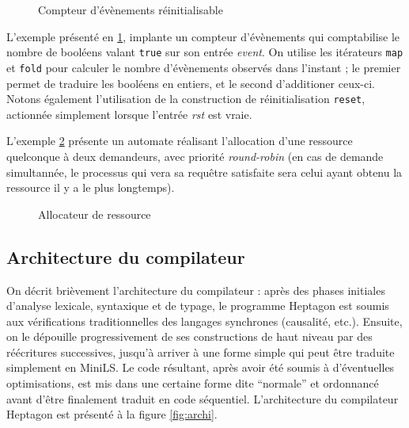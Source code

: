 \documentclass[9pt,a4paper]{article}
\newcommand{\LANG}{Heptagon}
\begin{document}
\begin{figure}[htp]
  \centering
  
  \caption{Compteur d'évènements réinitialisable}
  \label{fig:ex_count}
\end{figure}

L'exemple présenté en \ref{fig:ex_count}, implante un compteur d'évènements qui
comptabilise le nombre de booléens valant \texttt{true} sur son entrée
\textit{event}. On utilise les itérateurs \texttt{map} et \texttt{fold} pour
calculer le nombre d'évènements observés dans l'instant ; le premier permet de
traduire les booléens en entiers, et le second d'additioner ceux-ci. Notons
également l'utilisation de la construction de réinitialisation \texttt{reset},
actionnée simplement lorsque l'entrée \textit{rst} est vraie.

L'exemple \ref{fig:ex_alloc} présente un automate réalisant l'allocation d'une
ressource quelconque à deux demandeurs, avec priorité \textit{round-robin} (en
cas de demande simultannée, le processus qui vera sa requêtre satisfaite sera
celui ayant obtenu la ressource il y a le plus longtemps).

\begin{figure}[htp]
  \centering
  
  \caption{Allocateur de ressource}
  \label{fig:ex_alloc}
\end{figure}

\subsection{Architecture du compilateur}

On décrit brièvement l'architecture du compilateur : après des phases initiales
d'analyse lexicale, syntaxique et de typage, le programme \LANG{} est soumis aux
vérifications traditionnelles des langages synchrones (causalité,
etc.). Ensuite, on le dépouille progressivement de ses constructions de haut
niveau par des réécritures successives, jusqu'à arriver à une forme simple qui
peut être traduite simplement en MiniLS. Le code résultant, après avoir été
soumis à d'éventuelles optimisations, est mis dans une certaine forme dite
``normale'' et ordonnancé avant d'être finalement traduit en code
séquentiel. L'architecture du compilateur \LANG{} est présenté à la figure
\ref{fig:archi}.

\end{document}
